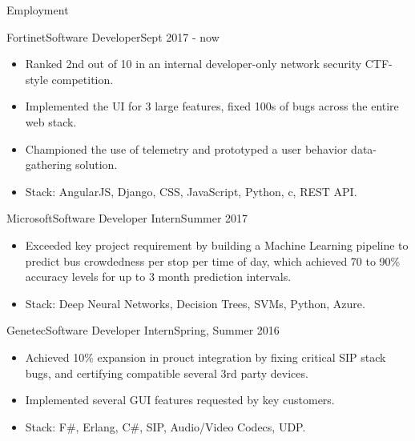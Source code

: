 \documentclass[]{muchicv}
\begin{document}
	\makeheader
	
	\begin{cvsection}{Employment}
		\begin{cvsubsection}{Fortinet}{Software Developer}{Sept 2017 - now}
			\begin{itemize}
				\item Ranked 2nd out of 10 in an internal developer-only network security CTF-style competition.
				\item Implemented the UI for 3 large features, fixed 100s of bugs across the entire web stack.
				\item Championed the use of telemetry and prototyped a user behavior data-gathering solution.
				\item Stack: AngularJS, Django, CSS, JavaScript, Python, c, REST API.
			\end{itemize}
		\end{cvsubsection}
		
		\begin{cvsubsection}{Microsoft}{Software Developer Intern}{Summer 2017}
			\begin{itemize}
				\item Exceeded key project requirement by building a Machine Learning pipeline to predict bus crowdedness per stop per time of day, which achieved 70 to 90\% accuracy levels for up to 3 month prediction intervals.
				\item Stack: Deep Neural Networks, Decision Trees, SVMs, Python, Azure.
			\end{itemize}
		\end{cvsubsection}
		
		\begin{cvsubsection}{Genetec}{Software Developer Intern}{Spring, Summer 2016}
			\begin{itemize}
				\item Achieved 10\% expansion in prouct integration by fixing critical SIP stack bugs, and certifying compatible several 3rd party devices.
				\item Implemented several GUI features requested by key customers.
				\item Stack: F\#, Erlang, C\#, SIP, Audio/Video Codecs, UDP.
			\end{itemize}
		\end{cvsubsection}


\end{cvsection}
\end{document}
